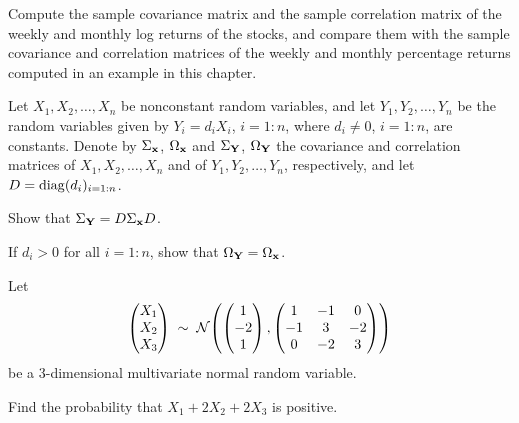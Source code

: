 \begin{exercises}
\begin{subparts}
\item Compute the sample covariance matrix and the sample correlation matrix of the
weekly and monthly log returns of the stocks, and compare them with the sample
covariance and correlation matrices of the weekly and monthly percentage returns
computed in an example in this chapter.
\end{subparts}

\item Let $X_1, X_2, \ldots, X_n$ be nonconstant random variables, and let $Y_1, Y_2,
\ldots, Y_n$ be the random variables given by $Y_i = d_iX_i$, $i = 1:n$, where $d_i \neq
0$, $i = 1:n$, are constants. Denote by $\Sigma_{\mathbf{x}}$, $\Omega_{\mathbf{x}}$ and
$\Sigma_{\mathbf{Y}}$, $\Omega_{\mathbf{Y}}$ the covariance and correlation matrices of $X_1, X_2,
\ldots, X_n$ and of $Y_1, Y_2, \ldots, Y_n$, respectively, and let $D =
\operatorname{diag}(d_i)_{i=1:n}$.

\begin{subparts}
\item Show that $\Sigma_{\mathbf{Y}} = D\Sigma_{\mathbf{x}}D$.
\item If $d_i > 0$ for all $i = 1:n$, show that $\Omega_{\mathbf{Y}} = \Omega_{\mathbf{x}}$.
\end{subparts}

\item Let
\[
\begin{pmatrix} X_1 \\ X_2 \\ X_3 \end{pmatrix} \;\sim\; \mathcal{N}\!\left(
\begin{pmatrix} 1 \\ -2 \\ 1 \end{pmatrix},
\begin{pmatrix} 1 & -1 & 0 \\ -1 & 3 & -2 \\ 0 & -2 & 3 \end{pmatrix}\right)
\]
be a 3-dimensional multivariate normal random variable.

Find the probability that $X_1 + 2X_2 + 2X_3$ is positive.


\end{exercises}

